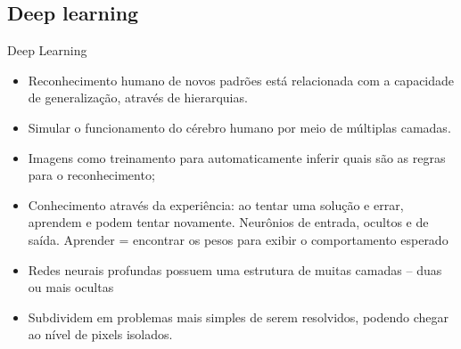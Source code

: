 \documentclass{beamer}
\begin{document}
\subsection{Deep learning}
\begin{frame}{Deep Learning}
\begin{itemize}
  \item Reconhecimento humano de novos padrões está relacionada com a capacidade de generalização, através de hierarquias.%
  \item Simular o funcionamento do cérebro humano por meio de múltiplas camadas.
  \item Imagens como treinamento para automaticamente inferir quais são as regras para o reconhecimento;
  \item Conhecimento através da experiência: ao tentar uma solução e errar, aprendem e podem tentar novamente. Neurônios de entrada, ocultos e de saída. Aprender = encontrar os pesos para exibir o comportamento esperado%
  \item Redes neurais profundas possuem uma estrutura de muitas camadas -- duas ou mais ocultas %
  \item Subdividem em problemas mais simples de serem resolvidos, podendo chegar ao nível de pixels isolados.
\end{itemize}






\end{frame}
\end{document}
